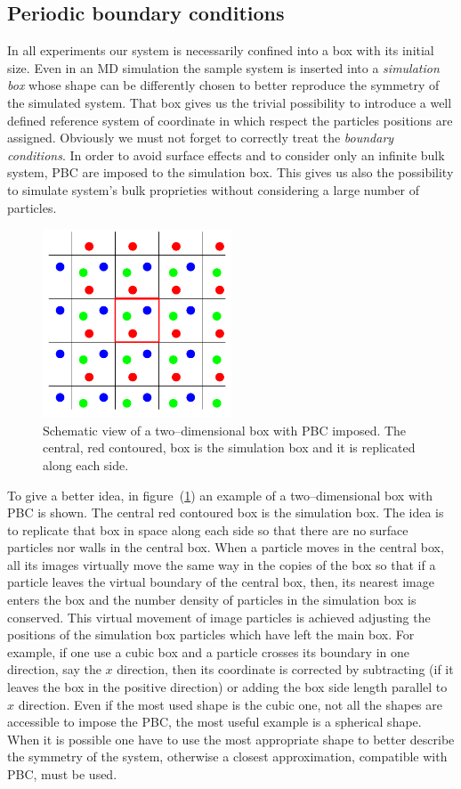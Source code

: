 \subsection{Periodic boundary conditions}
In all experiments our system is necessarily confined into a box with its initial size. Even in an \ac{MD} simulation the sample system is inserted into a \textit{simulation box} whose shape can be differently chosen to better reproduce the symmetry of the simulated system. That box gives us the trivial possibility to introduce a well defined reference system of coordinate in which respect the particles positions are assigned. Obviously we must not forget to correctly treat the \textit{boundary conditions}. In order to avoid surface effects and to consider only an infinite bulk system, \ac{PBC} are imposed to the simulation box. This gives us also the possibility to simulate system's bulk proprieties without considering a large number of particles.
\begin{figure}
	\includegraphics[width=0.5\textwidth]{./img/PBCScheme/PBCScheme}
	\caption{Schematic view of a two--dimensional box with \acs{PBC} imposed. The central, red contoured, box is the simulation box and it is replicated along each side.}
	\label{fig:pbc}
\end{figure}
To give a better idea, in figure~(\ref{fig:pbc}) an example of a two--dimensional box with \ac{PBC} is shown. The central red contoured box is the simulation box. The idea is to replicate that box in space along each side so that there are no surface particles nor walls in the central box. When a particle moves in the central box, all its images virtually move the same way in the copies of the box so that if a particle leaves the virtual boundary of the central box, then, its nearest image enters the box and the number density of particles in the simulation box is conserved.
This virtual movement of image particles is achieved adjusting the positions of the simulation box particles which have left the main box. For example, if one use a cubic box and a particle crosses its boundary in one direction, say the $x$ direction, then its coordinate is corrected by subtracting (if it leaves the box in the positive direction) or adding the box side length parallel to $x$ direction. Even if the most used shape is the cubic one, not all the shapes are accessible to impose the \ac{PBC}, the most useful example is a spherical shape. When it is possible one have to use the most appropriate shape to better describe the symmetry of the system, otherwise a closest approximation, compatible with \ac{PBC}, must be used.

